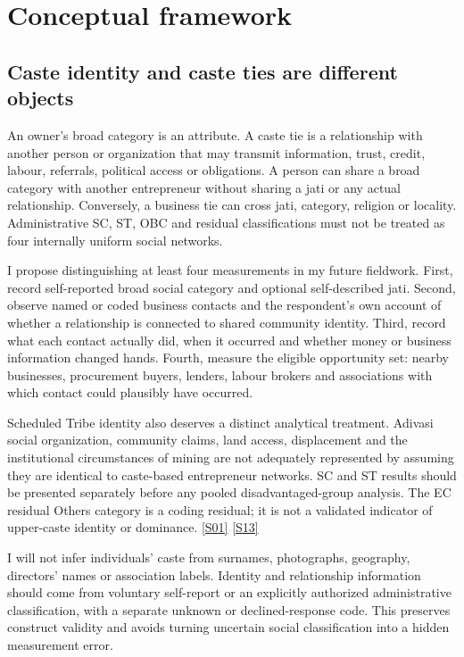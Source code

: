 \documentclass[11pt,a4paper]{report}
\begin{document}
\chapter{Conceptual framework}
\section{Caste identity and caste ties are different objects}
An owner's broad category is an attribute. A caste tie is a relationship with another person or organization that may transmit information, trust, credit, labour, referrals, political access or obligations. A person can share a broad category with another entrepreneur without sharing a jati or any actual relationship. Conversely, a business tie can cross jati, category, religion or locality. Administrative SC, ST, OBC and residual classifications must not be treated as four internally uniform social networks.

I propose distinguishing at least four measurements in my future fieldwork. First, record self-reported broad social category and optional self-described jati. Second, observe named or coded business contacts and the respondent's own account of whether a relationship is connected to shared community identity. Third, record what each contact actually did, when it occurred and whether money or business information changed hands. Fourth, measure the eligible opportunity set: nearby businesses, procurement buyers, lenders, labour brokers and associations with which contact could plausibly have occurred.

Scheduled Tribe identity also deserves a distinct analytical treatment. Adivasi social organization, community claims, land access, displacement and the institutional circumstances of mining are not adequately represented by assuming they are identical to caste-based entrepreneur networks. SC and ST results should be presented separately before any pooled disadvantaged-group analysis. The EC residual Others category is a coding residual; it is not a validated indicator of upper-caste identity or dominance. \hyperlink{S01}{[S01]} \hyperlink{S13}{[S13]}

I will not infer individuals' caste from surnames, photographs, geography, directors' names or association labels. Identity and relationship information should come from voluntary self-report or an explicitly authorized administrative classification, with a separate unknown or declined-response code. This preserves construct validity and avoids turning uncertain social classification into a hidden measurement error.
\end{document}
